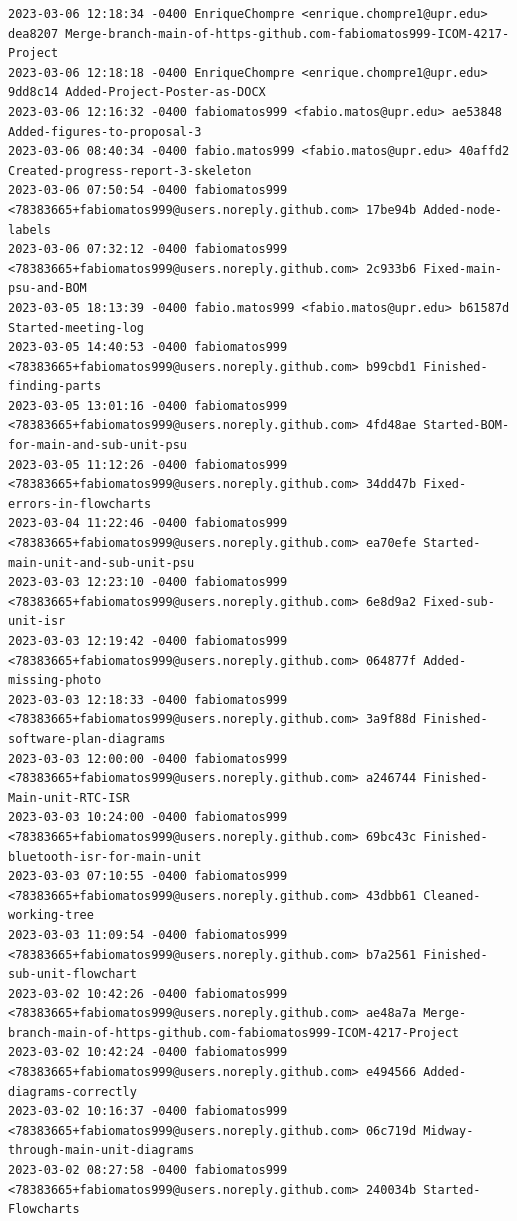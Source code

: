 \documentclass[12pt]{article}
\begin{document}
\begin{verbatim}
2023-03-06 12:18:34 -0400 EnriqueChompre <enrique.chompre1@upr.edu> dea8207 Merge-branch-main-of-https-github.com-fabiomatos999-ICOM-4217-Project
2023-03-06 12:18:18 -0400 EnriqueChompre <enrique.chompre1@upr.edu> 9dd8c14 Added-Project-Poster-as-DOCX
2023-03-06 12:16:32 -0400 fabiomatos999 <fabio.matos@upr.edu> ae53848 Added-figures-to-proposal-3
2023-03-06 08:40:34 -0400 fabio.matos999 <fabio.matos@upr.edu> 40affd2 Created-progress-report-3-skeleton
2023-03-06 07:50:54 -0400 fabiomatos999 <78383665+fabiomatos999@users.noreply.github.com> 17be94b Added-node-labels
2023-03-06 07:32:12 -0400 fabiomatos999 <78383665+fabiomatos999@users.noreply.github.com> 2c933b6 Fixed-main-psu-and-BOM
2023-03-05 18:13:39 -0400 fabio.matos999 <fabio.matos@upr.edu> b61587d Started-meeting-log
2023-03-05 14:40:53 -0400 fabiomatos999 <78383665+fabiomatos999@users.noreply.github.com> b99cbd1 Finished-finding-parts
2023-03-05 13:01:16 -0400 fabiomatos999 <78383665+fabiomatos999@users.noreply.github.com> 4fd48ae Started-BOM-for-main-and-sub-unit-psu
2023-03-05 11:12:26 -0400 fabiomatos999 <78383665+fabiomatos999@users.noreply.github.com> 34dd47b Fixed-errors-in-flowcharts
2023-03-04 11:22:46 -0400 fabiomatos999 <78383665+fabiomatos999@users.noreply.github.com> ea70efe Started-main-unit-and-sub-unit-psu
2023-03-03 12:23:10 -0400 fabiomatos999 <78383665+fabiomatos999@users.noreply.github.com> 6e8d9a2 Fixed-sub-unit-isr
2023-03-03 12:19:42 -0400 fabiomatos999 <78383665+fabiomatos999@users.noreply.github.com> 064877f Added-missing-photo
2023-03-03 12:18:33 -0400 fabiomatos999 <78383665+fabiomatos999@users.noreply.github.com> 3a9f88d Finished-software-plan-diagrams
2023-03-03 12:00:00 -0400 fabiomatos999 <78383665+fabiomatos999@users.noreply.github.com> a246744 Finished-Main-unit-RTC-ISR
2023-03-03 10:24:00 -0400 fabiomatos999 <78383665+fabiomatos999@users.noreply.github.com> 69bc43c Finished-bluetooth-isr-for-main-unit
2023-03-03 07:10:55 -0400 fabiomatos999 <78383665+fabiomatos999@users.noreply.github.com> 43dbb61 Cleaned-working-tree
2023-03-03 11:09:54 -0400 fabiomatos999 <78383665+fabiomatos999@users.noreply.github.com> b7a2561 Finished-sub-unit-flowchart
2023-03-02 10:42:26 -0400 fabiomatos999 <78383665+fabiomatos999@users.noreply.github.com> ae48a7a Merge-branch-main-of-https-github.com-fabiomatos999-ICOM-4217-Project
2023-03-02 10:42:24 -0400 fabiomatos999 <78383665+fabiomatos999@users.noreply.github.com> e494566 Added-diagrams-correctly
2023-03-02 10:16:37 -0400 fabiomatos999 <78383665+fabiomatos999@users.noreply.github.com> 06c719d Midway-through-main-unit-diagrams
2023-03-02 08:27:58 -0400 fabiomatos999 <78383665+fabiomatos999@users.noreply.github.com> 240034b Started-Flowcharts

\end{verbatim}
\end{document}
